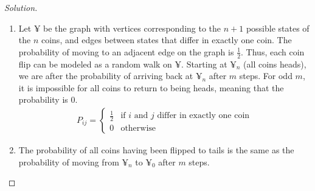 \documentclass[11pt]{scrartcl}
\begin{document}
\begin{proof}[Solution]
\begin{enumerate}[{i}]
    \item Let $\yen$ be the graph with vertices corresponding to the $n + 1$ possible states of the $n$ coins, and edges between states that differ in exactly one coin. The probability of moving to an adjacent edge on the graph is $\frac{1}{2}$. Thus, each coin flip can be modeled as a random walk on $\yen$. Starting at $\yen_n$ (all coins heads), we are after the probability of arriving back at $\yen_n$ after $m$ steps. For odd $m$, it is impossible for all coins to return to being heads, meaning that the probability is 0. 
    \begin{align*}
        P_{ij} = \begin{cases}
            \frac{1}{2} & \text{if } i \text{ and } j \text{ differ in exactly one coin} \\
            0 & \text{otherwise}
        \end{cases}
    \end{align*}
    \item The probability of all coins having been flipped to tails is the same as the probability of moving from $\yen_n$ to $\yen_0$ after $m$ steps. 
\end{enumerate}

\end{proof}
\end{document}
